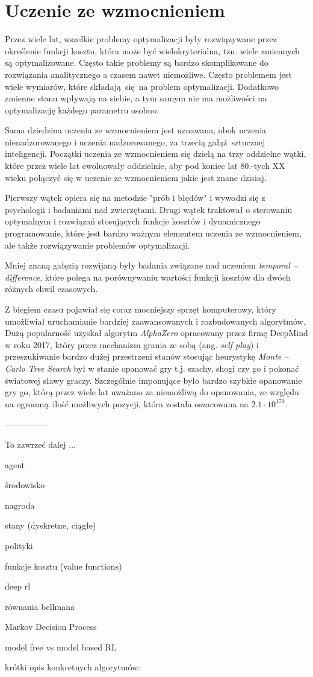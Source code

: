 \chapter{Uczenie ze wzmocnieniem}
\label{cha:rozdzial3}

Przez wiele lat, wszelkie problemy optymalizacji były rozwiązywane przez 
określenie funkcji kosztu, która może być wielokryterialna, tzn. wiele 
zmiennych są optymalizowane. Często takie problemy są bardzo skomplikowane do 
rozwiązania analitycznego a czasem nawet niemożliwe. Często problemem jest 
wiele wymiarów, które składają się na problem optymalizacji. Dodatkowo zmienne 
stanu wpływają na siebie, a tym samym nie ma możliwości na optymalizację 
każdego parametru osobno.

Sama dziedzina uczenia ze wzmocnieniem jest uznawana, obok uczenia 
nienadzorowanego i uczenia nadzorowanego, za trzecią gałąź sztucznej 
inteligencji. Początki uczenia ze wzmocnieniem się dzielą na trzy oddzielne 
wątki, które przez wiele lat ewoluowały oddzielnie, aby pod koniec lat 80.-tych 
XX wieku połączyć się w uczenie ze wzmocnieniem jakie jest znane dzisiaj.

Pierwszy wątek opiera się na metodzie "prób i błędów" i wywodzi się z 
psychologii i badaniami nad zwierzętami. Drugi wątek traktował o sterowaniu 
optymalnym i rozwiązań stosujących funkcje kosztów i dynamicznego 
programowanie, które jest bardzo ważnym elementem uczenia ze wzmocnieniem, ale 
także rozwiązywanie problemów optymalizacji.

Mniej znaną gałęzią rozwijaną były badania związane nad uczeniem 
\textit{temporal -- difference}, które polega na porównywaniu wartości funkcji 
kosztów dla dwóch różnych chwil czasowych. 

Z biegiem czasu pojawiał się coraz mocniejszy sprzęt komputerowy, który 
umożliwiał uruchamianie bardziej zaawansowanych i rozbudowanych algorytmów. 
Dużą popularność uzyskał algorytm \textit{AlphaZero} opracowany przez firmę 
DeepMind w roku 2017, który przez mechanizm grania ze sobą (ang. \textit{self 
play}) i przeszukiwanie bardzo dużej przestrzeni stanów stosując heurystykę 
\textit{Monte -- Carlo Tree Search} był w stanie opanować gry t.j. szachy, 
shogi czy go i pokonać światowej sławy graczy. Szczególnie imponujące było 
bardzo szybkie opanowanie gry go, którą przez wiele lat uważano za niemożliwą 
do opanowania, ze względu na ogromną ilość możliwych pozycji, która została 
oszacowana na $2.1 \cdot 10^{170}$.


---------------

To zawrzeć dalej $\dots$

agent

środowisko

nagroda

stany (dyskretne, ciągłe)

polityki

funkcje kosztu (value functions)

deep rl

równania bellmana

Markov Decision Process

model free vs model based RL



krótki opis konkretnych algorytmów:


